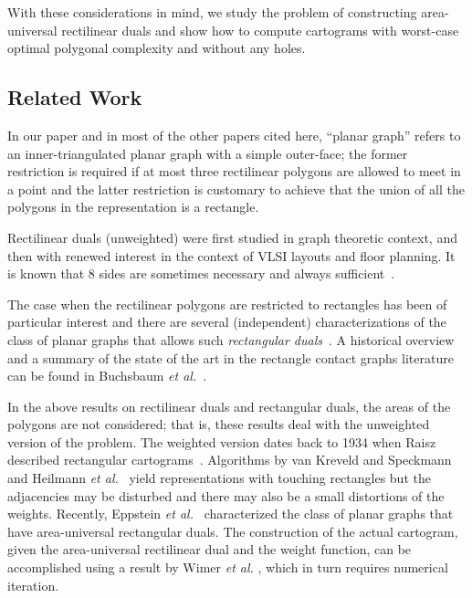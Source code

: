 \documentclass[11pt]{article}
\begin{document}
With these considerations in mind, we study the problem of
constructing area-universal rectilinear duals and show how to compute
cartograms with worst-case optimal polygonal complexity and without
any holes.



\subsection{Related Work}

In our paper and in most of the other papers cited here, ``planar graph''
refers to an inner-triangulated planar graph with a simple outer-face;
the former restriction is required if at most three rectilinear polygons are
allowed to meet in a point and the latter restriction is customary to
achieve that the union of all the polygons in the representation is a
rectangle.

Rectilinear duals (unweighted) were first studied in graph
theoretic context, and then with renewed interest in the context of
VLSI layouts and floor planning. It is known that $8$ sides are sometimes
necessary and always sufficient~\cite{He99,Liao03,ys93}.

The case when the rectilinear
polygons are restricted to rectangles has been of particular interest and
there are several (independent) characterizations of the class of
planar graphs that allows such {\em rectangular duals}~\cite{u-drg-53,LL-abrf-84,kk-rdpg-85}.
A historical overview
and a summary of the state of the art in the rectangle contact graphs
literature can be found in Buchsbaum {\em et al.}~\cite{Buchsbaum08}.

In the above results on rectilinear duals and rectangular duals, the areas of
the polygons are not considered; that is, these
results deal with the unweighted version of the problem.
The weighted version dates back to 1934 when Raisz described rectangular
cartograms~\cite{r-rsc-34}.
Algorithms by van Kreveld and Speckmann~\cite{ks07} and
Heilmann {\em et al.}~\cite{hkps04} yield representations with
touching rectangles but the adjacencies may be disturbed and
there may also be a small distortions of the weights. Recently, Eppstein
{\em et al.}~\cite{EMVS} characterized the class of planar graphs that
have area-universal rectangular duals.
The construction of the actual cartogram, given the area-universal
rectilinear dual and the weight function, can be accomplished
using a result by Wimer \textit{et al.} \cite{WKC}, which in turn requires numerical iteration.
\end{document}
